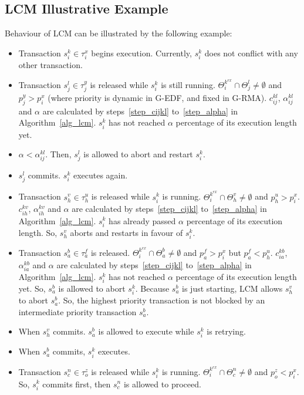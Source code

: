 \subsection{LCM Illustrative Example}
%
Behaviour of LCM can be illustrated by the following example:
\begin{itemize}
\item Transaction $s_{i}^{k}\in\tau_{i}^{x}$ begins execution.
Currently, $s_{i}^{k}$ does not conflict with any other transaction.
\item Transaction $s_{j}^{l}\in\tau_{j}^{y}$ is released while
$s_{i}^{k}$ is still running. $\Theta_i^{k^{ex}} \cap \Theta_j^l \neq \emptyset$ and $p_{j}^{y}>p_{i}^{x}$ (where priority is dynamic in G-EDF, and fixed in G-RMA). $c_{ij}^{kl}$,
$\alpha_{ij}^{kl}$ and $\alpha$ are calculated by steps~\ref{step_cijkl} to~\ref{step_alpha} 
in Algorithm~\ref{alg_lcm}. $s_{i}^{k}$ has not reached $\alpha$
percentage of its execution length yet. 
\item $\alpha<\alpha_{ij}^{kl}$. Then, $s_{j}^{l}$ is allowed
to abort and restart $s_{i}^{k}$.
\item $s_{j}^{l}$ commits. $s_{i}^{k}$ executes again.
\item Transaction $s_{h}^{v}\in\tau_{h}^{u}$ is released while
$s_{i}^{k}$ is running. $\Theta_i^{k^{ex}} \cap \Theta_h^v \neq \emptyset$ and $p_{h}^{u}>p_{i}^{x}$. $c_{ih}^{kv}$,
$\alpha_{ih}^{kv}$ and $\alpha$ are calculated by steps~\ref{step_cijkl} to~\ref{step_alpha}
in Algorithm~\ref{alg_lcm}. $s_{i}^{k}$ has already passed $\alpha$
percentage of its execution length. So, $s_{h}^{v}$ aborts
and restarts in favour of $s_{i}^{k}$.
\item Transaction $s_{a}^{b}\in\tau_{a}^{f}$ is released. $\Theta_i^{k^{ex}} \cap \Theta_a^b \neq \emptyset$ and $p_{a}^{f}>p_{i}^{x}$
but $p_{a}^{f}<p_{h}^{u}$. $c_{ia}^{kb}$, $\alpha_{ia}^{kb}$
and $\alpha$ are calculated by steps~\ref{step_cijkl} to~\ref{step_alpha} in Algorithm~\ref{alg_lcm}.
$s_{i}^{k}$ has not reached $\alpha$ percentage of its execution
length yet. So, $s_{a}^{b}$ is allowed to abort $s_{i}^{k}$.
Because $s_{a}^{b}$ is just starting, LCM allows $s_{h}^{v}$
to abort $s_{a}^{b}$. So, the highest priority transaction
is not blocked by an intermediate priority transaction $s_{a}^{b}$.
\item When $s_{h}^{v}$ commits. $s_{a}^{b}$ is allowed
to execute while $s_{i}^{k}$ is retrying.
\item When $s_{a}^{b}$ commits, $s_{i}^{k}$ executes.
\item Transaction $s_{c}^{n}\in\tau_{o}^{z}$ is released while
$s_{i}^{k}$ is running. $\Theta_i^{k^{ex}} \cap \Theta_c^n \neq \emptyset$ and $p_{o}^{z}<p_{i}^{x}$. So, $s_{i}^{k}$
commits first, then $s_{c}^{n}$ is allowed to proceed.
\end{itemize} 
%
